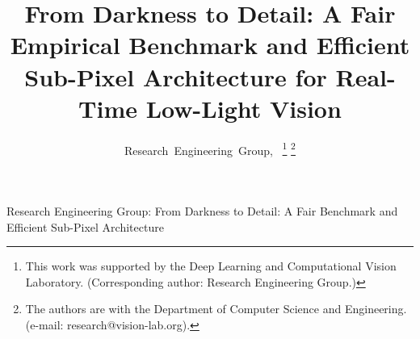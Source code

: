 \documentclass[journal,onecolumn,11pt]{IEEEtran}
\begin{document}

\title{From Darkness to Detail: A Fair Empirical Benchmark and Efficient Sub-Pixel Architecture for Real-Time Low-Light Vision}

\author{Research~Engineering~Group,~
\thanks{This work was supported by the Deep Learning and Computational Vision Laboratory. (Corresponding author: Research Engineering Group.)}
\thanks{The authors are with the Department of Computer Science and Engineering. (e-mail: research@vision-lab.org).}}

%
{Research Engineering Group: From Darkness to Detail: A Fair Benchmark and Efficient Sub-Pixel Architecture}

\maketitle
\end{document}
